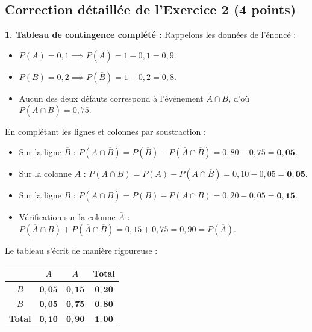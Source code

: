 \documentclass[11pt,a4paper]{article}
\begin{document}
\vspace{0.4cm}

\subsection*{Correction détaillée de l'Exercice 2 \hfill (4 points)}

\begin{correctionbox}
\textbf{1. Tableau de contingence complété :}
Rappelons les données de l'énoncé :
\begin{itemize}[label=$\bullet$]
    \item $P(A) = 0{,}1 \implies P(\overline{A}) = 1 - 0{,}1 = 0{,}9$.
    \item $P(B) = 0{,}2 \implies P(\overline{B}) = 1 - 0{,}2 = 0{,}8$.
    \item \og Aucun des deux défauts \fg{} correspond à l'événement $\overline{A} \cap \overline{B}$, d'où $P(\overline{A} \cap \overline{B}) = 0{,}75$.
\end{itemize}
En complétant les lignes et colonnes par soustraction :
\begin{itemize}[label=$\bullet$]
    \item Sur la ligne $\overline{B}$ : $P(A \cap \overline{B}) = P(\overline{B}) - P(\overline{A} \cap \overline{B}) = 0{,}80 - 0{,}75 = \mathbf{0{,}05}$.
    \item Sur la colonne $A$ : $P(A \cap B) = P(A) - P(A \cap \overline{B}) = 0{,}10 - 0{,}05 = \mathbf{0{,}05}$.
    \item Sur la ligne $B$ : $P(\overline{A} \cap B) = P(B) - P(A \cap B) = 0{,}20 - 0{,}05 = \mathbf{0{,}15}$.
    \item Vérification sur la colonne $\overline{A}$ : $P(\overline{A} \cap B) + P(\overline{A} \cap \overline{B}) = 0{,}15 + 0{,}75 = 0{,}90 = P(\overline{A})$.
\end{itemize}

Le tableau s'écrit de manière rigoureuse :
\begin{center}
\renewcommand{\arraystretch}{1.35}
\begin{tabular}{|c|c|c|c|}
    \hline
    & \textbf{$A$} & \textbf{$\overline{A}$} & \textbf{Total} \\
    \hline
    \textbf{$B$} & $\mathbf{0{,}05}$ & $\mathbf{0{,}15}$ & $\mathbf{0{,}20}$ \\
    \hline
    \textbf{$\overline{B}$} & $\mathbf{0{,}05}$ & $\mathbf{0{,}75}$ & $\mathbf{0{,}80}$ \\
    \hline
    \textbf{Total} & $\mathbf{0{,}10}$ & $\mathbf{0{,}90}$ & $\mathbf{1{,}00}$ \\
    \hline
\end{tabular}
\end{center}


\end{correctionbox}
\end{document}
